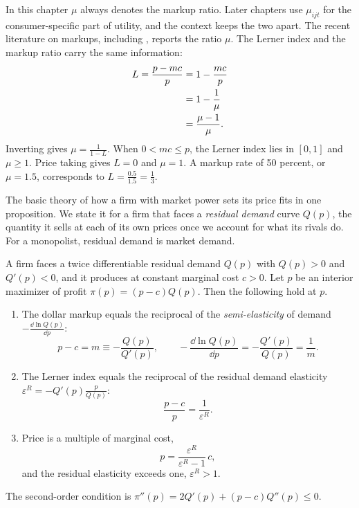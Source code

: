 In this chapter $\mu$ always denotes the markup ratio. Later chapters use $\mu_{ijt}$ for the consumer-specific
part of utility, and the context keeps the two apart. The recent literature on markups, including
\citet{DeLoeckerEeckhoutUnger2020}, reports the ratio $\mu$. The Lerner index and the markup ratio carry the
same information:
\begin{align}
  L = \frac{p - mc}{p} &= 1 - \frac{mc}{p} \notag\\
  &= 1 - \frac{1}{\mu} \notag\\
  &= \frac{\mu - 1}{\mu} . \label{eq:01-lerner-mu}
\end{align}
Inverting gives $\mu = \frac{1}{1 - L}$. When $0 < mc \le p$, the Lerner index lies in $[0, 1]$ and
$\mu \ge 1$. Price taking gives $L = 0$ and $\mu = 1$. A markup rate of 50 percent, or $\mu = 1.5$, corresponds
to $L = \frac{0.5}{1.5} = \frac{1}{3}$.

The basic theory of how a firm with market power sets its price fits in one proposition. We state it for a firm
that faces a \emph{residual demand} curve $Q(p)$, the quantity it sells at each of its own prices once we
account for what its rivals do. For a monopolist, residual demand is market demand.

\begin{proposition}\label{prop:01-pricing-rule}
A firm faces a twice differentiable residual demand $Q(p)$ with $Q(p) > 0$ and $Q'(p) < 0$, and it produces
at constant marginal cost $c > 0$. Let $p$ be an interior maximizer of profit $\pi(p) = (p - c)Q(p)$. Then the
following hold at $p$.
\begin{enumerate}[label=(\roman*)]
  \item The dollar markup equals the reciprocal of the \emph{semi-elasticity} of demand
  $-\frac{\dd \ln Q(p)}{\dd p}$:
  \begin{equation}\label{eq:01-dollar-markup}
    p - c = m \equiv -\frac{Q(p)}{Q'(p)}, \qquad -\frac{\dd \ln Q(p)}{\dd p} = -\frac{Q'(p)}{Q(p)} = \frac{1}{m}.
  \end{equation}
  \item The Lerner index equals the reciprocal of the residual demand elasticity
  $\varepsilon^R = -Q'(p)\frac{p}{Q(p)}$:
  \begin{equation}\label{eq:01-lerner-rule}
    \frac{p - c}{p} = \frac{1}{\varepsilon^R} .
  \end{equation}
  \item Price is a multiple of marginal cost,
  \begin{equation}\label{eq:01-price-multiple}
    p = \frac{\varepsilon^R}{\varepsilon^R - 1}\, c ,
  \end{equation}
  and the residual elasticity exceeds one, $\varepsilon^R > 1$.
\end{enumerate}
The second-order condition is $\pi''(p) = 2Q'(p) + (p - c)Q''(p) \le 0$.
\end{proposition}

